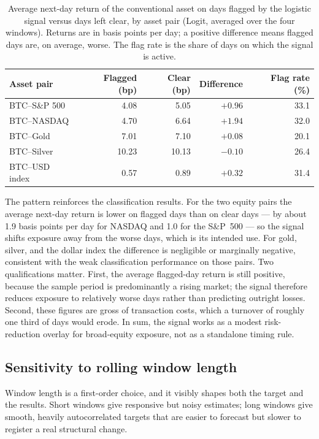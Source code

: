 \begin{table}[H]
    \centering
    \caption{Average next-day return of the conventional asset on days flagged by the logistic signal versus days left clear, by asset pair (Logit, averaged over the four windows). Returns are in basis points per day; a positive difference means flagged days are, on average, worse. The flag rate is the share of days on which the signal is active.}
    \label{tab:signal_returns}
    \begin{tabular}{lrrrr}
        \toprule
        Asset pair & Flagged (bp) & Clear (bp) & Difference & Flag rate (\%) \\
        \midrule
        BTC--S\&P 500  & 4.08 & 5.05 & $+0.96$ & 33.1 \\
        BTC--NASDAQ    & 4.70 & 6.64 & $+1.94$ & 32.0 \\
        BTC--Gold      & 7.01 & 7.10 & $+0.08$ & 20.1 \\
        BTC--Silver    & 10.23 & 10.13 & $-0.10$ & 26.4 \\
        BTC--USD index & 0.57 & 0.89 & $+0.32$ & 31.4 \\
        \bottomrule
    \end{tabular}
\end{table}

The pattern reinforces the classification results. For the two equity pairs the average next-day return is lower on flagged days than on clear days --- by about 1.9 basis points per day for NASDAQ and 1.0 for the S\&P~500 --- so the signal shifts exposure away from the worse days, which is its intended use. For gold, silver, and the dollar index the difference is negligible or marginally negative, consistent with the weak classification performance on those pairs. Two qualifications matter. First, the average flagged-day return is still positive, because the sample period is predominantly a rising market; the signal therefore reduces exposure to relatively worse days rather than predicting outright losses. Second, these figures are gross of transaction costs, which a turnover of roughly one third of days would erode. In sum, the signal works as a modest risk-reduction overlay for broad-equity exposure, not as a standalone timing rule.

\subsection{Sensitivity to rolling window length}

Window length is a first-order choice, and it visibly shapes both the target and the results. Short windows give responsive but noisy estimates; long windows give smooth, heavily autocorrelated targets that are easier to forecast but slower to register a real structural change.

